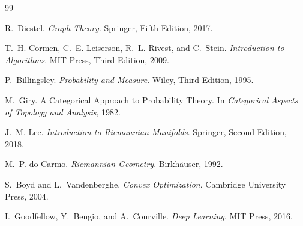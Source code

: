 \documentclass[12pt,oneside]{article}
\theoremstyle{definition}
\theoremstyle{remark}
\begin{document}
\begin{thebibliography}{99}

R.~Diestel.
\newblock \emph{Graph Theory}.
\newblock Springer, Fifth Edition, 2017.


T.~H. Cormen, C.~E. Leiserson, R.~L. Rivest, and C.~Stein.
\newblock \emph{Introduction to Algorithms}.
\newblock MIT Press, Third Edition, 2009.


P.~Billingsley.
\newblock \emph{Probability and Measure}.
\newblock Wiley, Third Edition, 1995.

M.~Giry.
\newblock A Categorical Approach to Probability Theory.
\newblock In \emph{Categorical Aspects of Topology and Analysis}, 1982.


J.~M. Lee.
\newblock \emph{Introduction to Riemannian Manifolds}.
\newblock Springer, Second Edition, 2018.

M.~P. do Carmo.
\newblock \emph{Riemannian Geometry}.
\newblock Birkh{\"a}user, 1992.


S.~Boyd and L.~Vandenberghe.
\newblock \emph{Convex Optimization}.
\newblock Cambridge University Press, 2004.


I.~Goodfellow, Y.~Bengio, and A.~Courville.
\newblock \emph{Deep Learning}.
\newblock MIT Press, 2016.



\end{thebibliography}
\end{document}
